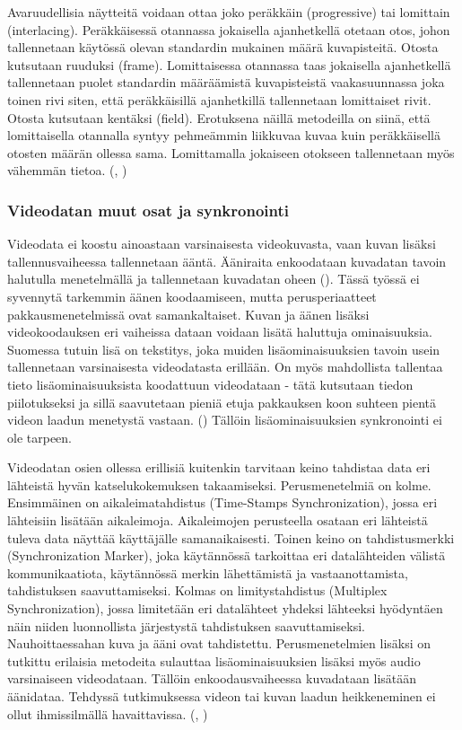 Avaruudellisia näytteitä voidaan ottaa joko peräkkäin (progressive) tai
lomittain (interlacing). Peräkkäisessä otannassa jokaisella ajanhetkellä
otetaan otos, johon tallennetaan käytössä olevan standardin mukainen
määrä kuvapisteitä. Otosta kutsutaan ruuduksi (frame). Lomittaisessa
otannassa taas jokaisella ajanhetkellä tallennetaan puolet standardin
määräämistä kuvapisteistä vaakasuunnassa joka toinen rivi siten, että
peräkkäisillä ajanhetkillä tallennetaan lomittaiset rivit. Otosta kutsutaan
kentäksi (field). Erotuksena näillä metodeilla on siinä, että lomittaisella
otannalla syntyy pehmeämmin liikkuvaa kuvaa kuin peräkkäisellä otosten määrän
ollessa sama. Lomittamalla jokaiseen otokseen tallennetaan myös vähemmän tietoa.
(\citealt{h264}, \citealt{du})

\subsubsection{Videodatan muut osat ja synkronointi}

Videodata ei koostu ainoastaan varsinaisesta videokuvasta, vaan kuvan lisäksi
tallennusvaiheessa tallennetaan ääntä. Ääniraita enkoodataan kuvadatan tavoin
halutulla menetelmällä ja tallennetaan kuvadatan oheen (\citealt{mpeg_app}). Tässä
työssä ei syvennytä tarkemmin äänen koodaamiseen, mutta perusperiaatteet
pakkausmenetelmissä ovat samankaltaiset. Kuvan ja äänen lisäksi videokoodauksen
eri vaiheissa dataan voidaan lisätä haluttuja ominaisuuksia. Suomessa tutuin
lisä on tekstitys, joka muiden lisäominaisuuksien tavoin usein tallennetaan
varsinaisesta videodatasta erillään. On myös mahdollista tallentaa tieto
lisäominaisuuksista koodattuun videodataan - tätä kutsutaan tiedon
piilotukseksi ja sillä saavutetaan pieniä etuja pakkauksen koon suhteen
pientä videon laadun menetystä vastaan. (\citealt{hiding}) Tällöin
lisäominaisuuksien synkronointi ei ole tarpeen.

Videodatan osien ollessa erillisiä kuitenkin tarvitaan keino tahdistaa data eri
lähteistä hyvän katselukokemuksen takaamiseksi. Perusmenetelmiä on kolme.
Ensimmäinen on aikaleimatahdistus (Time-Stamps Synchronization), jossa eri
lähteisiin lisätään aikaleimoja. Aikaleimojen perusteella osataan eri lähteistä
tuleva data näyttää käyttäjälle samanaikaisesti. Toinen keino on
tahdistusmerkki (Synchronization Marker), joka käytännössä tarkoittaa eri datalähteiden välistä
kommunikaatiota, käytännössä merkin lähettämistä ja vastaanottamista, tahdistuksen
saavuttamiseksi. Kolmas on 	limitystahdistus (Multiplex Synchronization), jossa
limitetään eri datalähteet yhdeksi lähteeksi hyödyntäen näin niiden
luonnollista järjestystä tahdistuksen saavuttamiseksi. Nauhoittaessahan kuva ja
ääni ovat tahdistettu. Perusmenetelmien lisäksi on tutkittu erilaisia metodeita
sulauttaa lisäominaisuuksien lisäksi myös audio varsinaiseen videodataan.
Tällöin enkoodausvaiheessa kuvadataan lisätään äänidataa. Tehdyssä
tutkimuksessa videon tai kuvan laadun heikkeneminen ei ollut ihmissilmällä
havaittavissa. (\citealt{sync}, \citealt{mujal})

